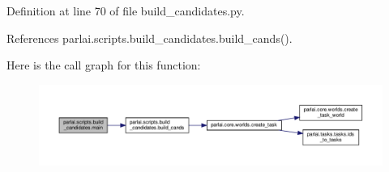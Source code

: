 Definition at line 70 of file build\+\_\+candidates.\+py.



References parlai.\+scripts.\+build\+\_\+candidates.\+build\+\_\+cands().

Here is the call graph for this function\+:
\nopagebreak
\begin{figure}[H]
\begin{center}
\leavevmode
\includegraphics[width=350pt]{namespaceparlai_1_1scripts_1_1build__candidates_a99ffd6743adcd4a6f0f5a26418d21a3a_cgraph}
\end{center}
\end{figure}
